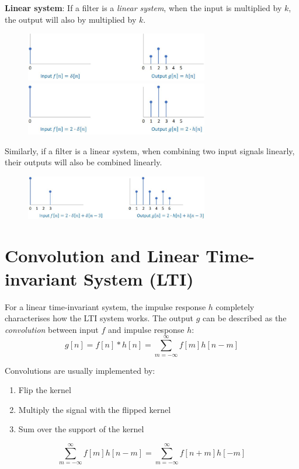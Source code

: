 \documentclass{report}
\begin{document}
\textbf{Linear system}: If a filter is a \textit{linear system},
when the input is multiplied by $k$, the output will also by multiplied by $k$.
\begin{figure}[h]
    \centering
    \includegraphics[width=8cm]{Linear response.JPG} \\ 
    \includegraphics[width=8cm]{Linear response 2.JPG} 
\end{figure}

Similarly, if a filter is a linear system, when combining two input signals linearly,
their outputs will also be combined linearly.
\begin{figure}[h]
    \centering
    \includegraphics[width=8cm]{Linear combined.JPG}
\end{figure}

\section{Convolution and Linear Time-invariant System (LTI)}

For a linear time-invariant system, the impulse response $h$ completely
characterises how the LTI system works. The output $g$ can be described as the
\textit{convolution} between input $f$ and impulse response $h$:
$$
    g[n] = f[n] * h[n] = \sum_{m=-\infty}^\infty f[m]h[n-m]
$$

Convolutions are usually implemented by: 
\begin{enumerate}
    \item Flip the kernel 
    \item Multiply the signal with the flipped kernel 
    \item Sum over the support of the kernel 
\end{enumerate}
$$
    \sum_{m=-\infty}^\infty f[m]h[n-m] = \sum_{m=-\infty}^\infty f[n+m]h[-m]
$$
\end{document}
